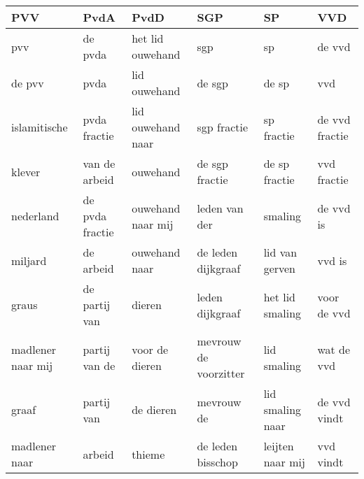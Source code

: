 \begin{tabular}{llllll}
\toprule
               PVV &             PvdA &               PvdD &                    SGP &                SP &             VVD \\
\midrule
               pvv &          de pvda &   het lid ouwehand &                    sgp &                sp &          de vvd \\
            de pvv &             pvda &       lid ouwehand &                 de sgp &             de sp &             vvd \\
      islamitische &     pvda fractie &  lid ouwehand naar &            sgp fractie &        sp fractie &  de vvd fractie \\
            klever &    van de arbeid &           ouwehand &         de sgp fractie &     de sp fractie &     vvd fractie \\
         nederland &  de pvda fractie &  ouwehand naar mij &          leden van der &           smaling &       de vvd is \\
           miljard &        de arbeid &      ouwehand naar &     de leden dijkgraaf &    lid van gerven &          vvd is \\
             graus &    de partij van &             dieren &        leden dijkgraaf &   het lid smaling &     voor de vvd \\
 madlener naar mij &    partij van de &     voor de dieren &  mevrouw de voorzitter &       lid smaling &      wat de vvd \\
             graaf &       partij van &          de dieren &             mevrouw de &  lid smaling naar &    de vvd vindt \\
     madlener naar &           arbeid &             thieme &      de leden bisschop &  leijten naar mij &       vvd vindt \\
\bottomrule
\end{tabular}
